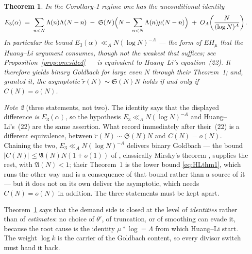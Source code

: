 \documentclass[11pt,a4paper]{article}
\theoremstyle{plain}
\newtheorem{theorem}{Theorem}
\theoremstyle{definition}
\theoremstyle{remark}
\newtheorem{note}[theorem]{Note}
\renewcommand{\SS}{\mathfrak{S}}
\newcommand{\AAA}{\mathfrak{A}}
\begin{document}
\begin{theorem}\label{thm:C}
In the Corollary-1 regime one has the unconditional identity
\[
  E_3(\alpha)\;=\;\sum_{n<N}\Lambda(n)\Lambda(N-n)
     \;-\;\SS(N)\Bigl(N-\sum_{n<N}\Lambda(n)\mu(N-n)\Bigr)
     \;+\;O_A\!\left(\frac{N}{(\log N)^{A}}\right).
\]
In particular the bound $E_3(\alpha)\ll_A N(\log N)^{-A}$ --- the form
of $EH_\mu$ that the Huang--Li argument consumes, though not the
weakest that suffices; see Proposition~\ref{prop:onesided} --- is
\emph{equivalent} to Huang--Li's equation~(22). It therefore yields
binary Goldbach for large even $N$ through their Theorem~1; and,
granted it, the asymptotic $\tilde r(N)\sim\SS(N)N$ holds if and only
if $C(N)=o(N)$.
\end{theorem}

\begin{note}[three statements, not two]\label{note:threeway}
The identity says that the displayed difference \emph{is}
$E_3(\alpha)$, so the hypothesis $E_3\ll_A N(\log N)^{-A}$ and
Huang--Li's~(22) are the same assertion. What \cite{HL} record
immediately after their~(22) is a different equivalence, between
$\tilde r(N)\sim\SS(N)N$ and $C(N)=o(N)$. Chaining the two,
$E_3\ll_A N(\log N)^{-A}$ delivers binary Goldbach --- the bound
$|C(N)|\le\AAA(N)N(1+o(1))$ of \cite[\S3.3]{HL}, classically Mirsky's
theorem \cite{Mir49}, supplies the rest, with $\AAA(N)<1$; their
Theorem~1 is the lower bound \eqref{eq:HLthm1}, which runs the other
way and is a consequence of that bound rather than a source of it ---
but it does not on its own deliver the
asymptotic, which needs $C(N)=o(N)$ in addition. The three statements
must be kept apart.
\end{note}

Theorem~\ref{thm:C} says that the demand side is closed at the level
of \emph{identities} rather than of \emph{estimates}: no choice of
$\theta'$, of truncation, or of smoothing can evade it, because the
root cause is the identity $\mu*\log=\Lambda$ from which Huang--Li
start. The weight $\log k$ is the carrier of the Goldbach content, so
every divisor switch must hand it back.
\end{document}
